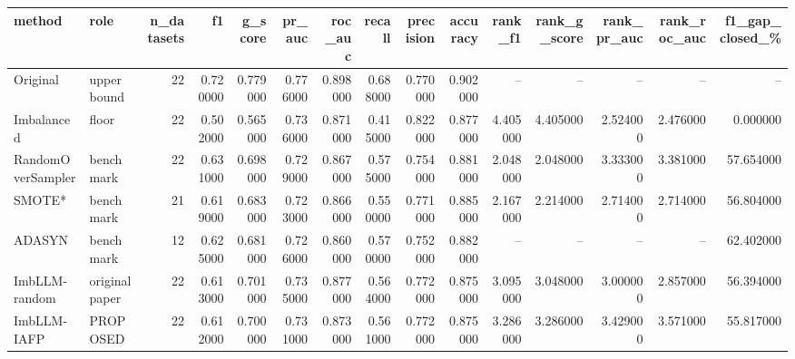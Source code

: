 \begin{tabular}{llrrrrrrrrrrrrr}
\toprule
method & role & n\_datasets & f1 & g\_score & pr\_auc & roc\_auc & recall & precision & accuracy & rank\_f1 & rank\_g\_score & rank\_pr\_auc & rank\_roc\_auc & f1\_gap\_closed\_\% \\
\midrule
Original & upper bound & 22 & 0.720000 & 0.779000 & 0.776000 & 0.898000 & 0.688000 & 0.770000 & 0.902000 & -- & -- & -- & -- & -- \\
Imbalanced & floor & 22 & 0.502000 & 0.565000 & 0.736000 & 0.871000 & 0.415000 & 0.822000 & 0.877000 & 4.405000 & 4.405000 & 2.524000 & 2.476000 & 0.000000 \\
RandomOverSampler & benchmark & 22 & 0.631000 & 0.698000 & 0.729000 & 0.867000 & 0.575000 & 0.754000 & 0.881000 & 2.048000 & 2.048000 & 3.333000 & 3.381000 & 57.654000 \\
SMOTE* & benchmark & 21 & 0.619000 & 0.683000 & 0.723000 & 0.866000 & 0.550000 & 0.771000 & 0.885000 & 2.167000 & 2.214000 & 2.714000 & 2.714000 & 56.804000 \\
ADASYN & benchmark & 12 & 0.625000 & 0.681000 & 0.726000 & 0.860000 & 0.570000 & 0.752000 & 0.882000 & -- & -- & -- & -- & 62.402000 \\
ImbLLM-random & original paper & 22 & 0.613000 & 0.701000 & 0.735000 & 0.877000 & 0.564000 & 0.772000 & 0.875000 & 3.095000 & 3.048000 & 3.000000 & 2.857000 & 56.394000 \\
ImbLLM-IAFP & PROPOSED & 22 & 0.612000 & 0.700000 & 0.731000 & 0.873000 & 0.561000 & 0.772000 & 0.875000 & 3.286000 & 3.286000 & 3.429000 & 3.571000 & 55.817000 \\
\bottomrule
\end{tabular}

